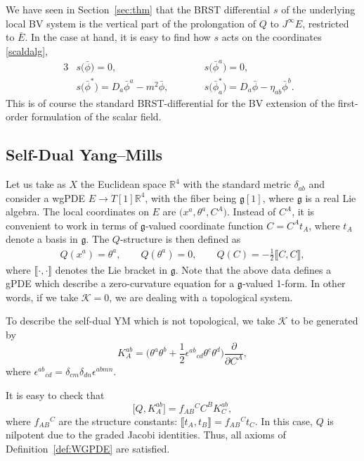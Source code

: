 \documentclass[10pt,a4paper]{amsart}
\numberwithin{equation}{section}
\theoremstyle{definition}
\newcommand{\Liealg}{\mathfrak}
\newcommand{\algg}{\Liealg{g}}
\def\cK{\mathcal{K}}
\newcommand{\lb}{\llbracket}
\newcommand{\rb}{\rrbracket}
\begin{document}
We have seen in Section~\ref{sec:thm} that the BRST differential $s$ of the underlying local BV system is the vertical part of the prolongation of $Q$ to $J^\infty E$, restricted to $\bar E$. In the case at hand, it is easy to find how $s$ acts on the coordinates \eqref{scaldalg},
\begin{alignat*}{3}
 &s\bigl(\bar\phi\bigr)=0,\qquad&& s\bigl(\bar\phi^a\bigr)=0,&\\
 &s\bigl(\bar\phi^*\bigr)=D_a\bar\phi^a-m^2\bar\phi,\qquad&& s\bigl(\bar\phi^*_a\bigr)=D_a\bar\phi-\eta_{ab}\bar\phi^b.&
 \end{alignat*}
This is of course the standard BRST-differential for the BV extension of the first-order formulation of the scalar field.

\subsection{Self-Dual Yang--Mills}%
Let us take as $X$ the Euclidean space $\mathbb{R}^4$ with the standard metric $\delta_{ab}$ and consider a wgPDE $E\rightarrow T[1]\mathbb{R}^4$, with the fiber being $\algg[1]$, where $\algg$ is a real Lie algebra. The local coordinates on $E$ are $\bigl(x^a,\theta^a,C^A\bigr)$. Instead of $C^A$, it is convenient to work in terms of $\algg$-valued coordinate function $C=C^At_A$, where $t_A$ denote a basis in $\algg$. The $Q$-structure is then defined as
\begin{gather*}%
 Q(x^a)=\theta^a,\qquad Q(\theta^a)=0,\qquad
 Q(C)=-\frac{1}{2}\lb C,C\rb,
\end{gather*}
where $\lb\cdot,\cdot\rb$ denotes the Lie bracket in $\algg$. Note that the above data defines a gPDE which describe a zero-curvature equation for a $\algg$-valued 1-form. In other words, if we take $\cK=0$, we are dealing with a topological system.

To describe the self-dual YM which is not topological, we take $\cK$ to be generated by
\begin{equation*}%
 K^{ab}_{A}=\biggl(\theta^a\theta^b+\frac12\epsilon^{ab}{}_{cd}\theta^c\theta^d\biggr)\frac{\partial}{\partial C^A},
\end{equation*}
where $\epsilon^{ab}{}_{cd}=\delta_{cm}\delta_{dn}\epsilon^{abmn}$.

It is easy to check that
\begin{equation*}
 \bigl[Q,K^{ab}_{A}\bigr]=f_{AB}{}^{C}C^B K^{ab}_{C},
\end{equation*}
where $f_{AB}{}^{C}$ are the structure constants: $\lb t_A,t_B \rb = f_{AB} {}^{C}t_C$.
In this case, $Q$ is nilpotent due to the graded Jacobi identities. Thus, all axioms of Definition~\ref{def:WGPDE} are satisfied.
\end{document}
